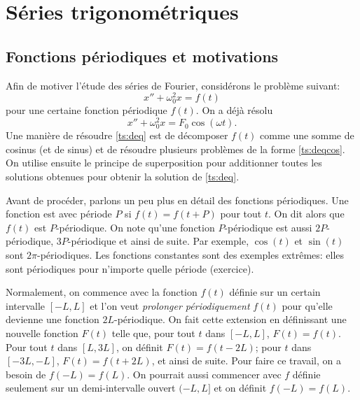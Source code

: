 \sectionnewpage
\section{Séries trigonométriques} \label{ts:section}

\subsection{Fonctions périodiques et motivations}

Afin de motiver l'étude des séries de Fourier, considérons le problème suivant:
\begin{equation} \label{ts:deq}
x'' + \omega_0^2 x = f(t)
\end{equation}
pour une certaine fonction périodique $f(t)$.
On a déjà résolu
\begin{equation} \label{ts:deqcos}
x'' + \omega_0^2 x = F_0 \cos ( \omega t) .
\end{equation}
Une manière de résoudre \eqref{ts:deq} est de décomposer $f(t)$ comme une somme de cosinus (et de sinus) et de résoudre plusieurs problèmes de la forme  \eqref{ts:deqcos}.  On utilise ensuite le principe de superposition pour additionner toutes les solutions obtenues pour obtenir la solution de \eqref{ts:deq}.

Avant de procéder, parlons un peu plus en détail des fonctions périodiques. 
Une fonction est  \emph{} avec période $P$ si
$f(t) = f(t+P)$ pour tout $t$.  On dit alors que $f(t)$ est $P$-périodique.
On note qu'une fonction $P$-périodique est aussi $2P$-périodique, $3P$-périodique
et ainsi de suite.
Par exemple, $\cos (t)$ et $\sin (t)$ sont
$2\pi$-périodiques.  
Les fonctions constantes sont des exemples extrêmes: elles sont périodiques pour n'importe quelle période (exercice). 

Normalement, on commence avec la fonction $f(t)$ définie sur un certain intervalle $[-L,L]$ et l'on veut \emph{prolonger périodiquement} $f(t)$ pour qu'elle devienne une fonction $2L$-périodique.  
On fait cette extension en définissant une nouvelle fonction $F(t)$
telle que, pour tout $t$ dans $[-L,L]$, $F(t) = f(t)$. Pour tout $t$ dans $[L,3L]$,
on définit $F(t) = f(t-2L)$; pour $t$ dans $[-3L,-L]$, $F(t) = f(t+2L)$, et ainsi de suite.
Pour faire ce travail, on a besoin de $f(-L) = f(L)$.
On pourrait aussi commencer avec $f$
définie seulement sur un demi-intervalle ouvert $(-L,L]$ et on définit $f(-L) = f(L)$.

